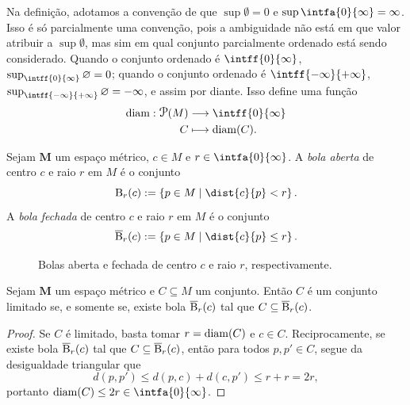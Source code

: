 Na definição, adotamos a convenção de que $\sup \emptyset = 0$ e $\sup \intfa{0}{\infty} = \infty$. Isso é só parcialmente uma convenção, pois a ambiguidade não está em que valor atribuir a $\sup \emptyset$, mas sim em qual conjunto parcialmente ordenado está sendo considerado. Quando o conjunto ordenado é $\intff{0}{\infty}$, $\sup_{\intff{0}{\infty}} \emptyset = 0$; quando o conjunto ordenado é $\intff{-\infty}{+\infty}$, $\sup_{\intff{-\infty}{+\infty}} \emptyset = -\infty$, e assim por diante. Isso define uma função
	\begin{align*}
	\func{\diam}{\p(M)}{\intff{0}{\infty}}{C}{\diam(C)}.
	\end{align*}

\begin{defi}
Sejam $\bm M$ um espaço métrico, $c \in M$ e $r \in \intfa{0}{\infty}$. A \emph{bola aberta} de centro $c$ e raio $r$ em $M$ é o conjunto
	\begin{equation*}
	\bola_r(c) := \set{p \in M}{\dist{c}{p} < r}.
	\end{equation*}
A \emph{bola fechada} de centro $c$ e raio $r$ em $M$ é o conjunto
	\begin{equation*}
	\overline\bola_r(c) := \set{p \in M}{\dist{c}{p} \leq r}.
	\end{equation*}
\end{defi}

\begin{figure}
\centering
{}\hspace{3cm}
\caption{Bolas aberta e fechada de centro $c$ e raio $r$, respectivamente.}
\end{figure}

\begin{prop}
Sejam $\bm M$ um espaço métrico e $C \subseteq M$ um conjunto. Então $C$ é um conjunto limitado se, e somente se, existe bola $\overline{\mathrm{B}}_r(c)$ tal que $C \subseteq \overline{\mathrm{B}}_r(c)$.
\end{prop}
\begin{proof}
Se $C$ é limitado, basta tomar $r=\operatorname{diam}(C)$ e $c \in C$. Reciprocamente, se existe bola $\overline{\mathrm{B}}_r(c)$ tal que $C \subseteq \overline{\mathrm{B}}_r(c)$, então para todos $p,p' \in C$, segue da desigualdade triangular que
	\begin{equation*}
	d(p,p') \leq d(p,c)+d(c,p') \leq r+r=2r,
	\end{equation*}
portanto $\diam(C) \leq 2r \in \intfa{0}{\infty}$.
\end{proof}

